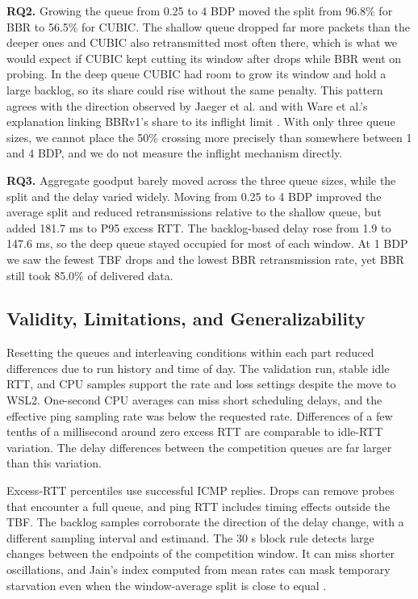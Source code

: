 \documentclass[11pt,a4paper]{article}
\begin{document}
\textbf{RQ2.} Growing the queue from 0.25 to 4 BDP moved the split from 96.8\% for BBR to 56.5\% for CUBIC. The shallow queue dropped far more packets than the deeper ones and CUBIC also retransmitted most often there, which is what we would expect if CUBIC kept cutting its window after drops while BBR went on probing. In the deep queue CUBIC had room to grow its window and hold a large backlog, so its share could rise without the same penalty. This pattern agrees with the direction observed by Jaeger et al. and with Ware et al.'s explanation linking BBRv1's share to its inflight limit \cite{jaeger2019,ware2019}. With only three queue sizes, we cannot place the 50\% crossing more precisely than somewhere between 1 and 4 BDP, and we do not measure the inflight mechanism directly.

\textbf{RQ3.} Aggregate goodput barely moved across the three queue sizes, while the split and the delay varied widely. Moving from 0.25 to 4 BDP improved the average split and reduced retransmissions relative to the shallow queue, but added 181.7 ms to P95 excess RTT. The backlog-based delay rose from 1.9 to 147.6 ms, so the deep queue stayed occupied for most of each window. At 1 BDP we saw the fewest TBF drops and the lowest BBR retransmission rate, yet BBR still took 85.0\% of delivered data.

\subsection{Validity, Limitations, and Generalizability}

Resetting the queues and interleaving conditions within each part reduced differences due to run history and time of day. The validation run, stable idle RTT, and CPU samples support the rate and loss settings despite the move to WSL2. One-second CPU averages can miss short scheduling delays, and the effective ping sampling rate was below the requested rate. Differences of a few tenths of a millisecond around zero excess RTT are comparable to idle-RTT variation. The delay differences between the competition queues are far larger than this variation.

Excess-RTT percentiles use successful ICMP replies. Drops can remove probes that encounter a full queue, and ping RTT includes timing effects outside the TBF. The backlog samples corroborate the direction of the delay change, with a different sampling interval and estimand. The 30 s block rule detects large changes between the endpoints of the competition window. It can miss shorter oscillations, and Jain's index computed from mean rates can mask temporary starvation even when the window-average split is close to equal \cite{jaeger2019}.
\end{document}
